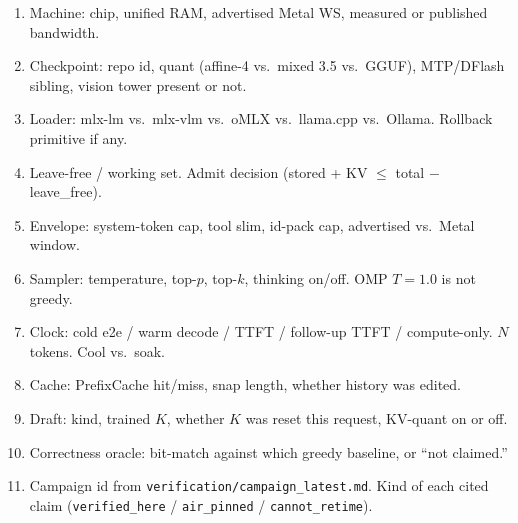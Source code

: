 \begin{enumerate}[leftmargin=1.4em]
\item Machine: chip, unified RAM, advertised Metal WS, measured or published bandwidth.
\item Checkpoint: repo id, quant (affine-4 vs.\ mixed 3.5 vs.\ GGUF), MTP/DFlash sibling, vision tower present or not.
\item Loader: mlx-lm vs.\ mlx-vlm vs.\ oMLX vs.\ llama.cpp vs.\ Ollama. Rollback primitive if any.
\item Leave-free / working set. Admit decision (stored + KV $\le$ total $-$ leave\_free).
\item Envelope: system-token cap, tool slim, id-pack cap, advertised vs.\ Metal window.
\item Sampler: temperature, top-$p$, top-$k$, thinking on/off. OMP $T{=}1.0$ is not greedy.
\item Clock: cold e2e / warm decode / TTFT / follow-up TTFT / compute-only. $N$ tokens. Cool vs.\ soak.
\item Cache: PrefixCache hit/miss, snap length, whether history was edited.
\item Draft: kind, trained $K$, whether $K$ was reset this request, KV-quant on or off.
\item Correctness oracle: bit-match against which greedy baseline, or ``not claimed.''
\item Campaign id from \texttt{verification/campaign\_latest.md}. Kind of each cited claim (\texttt{verified\_here} / \texttt{air\_pinned} / \texttt{cannot\_retime}).
\end{enumerate}


